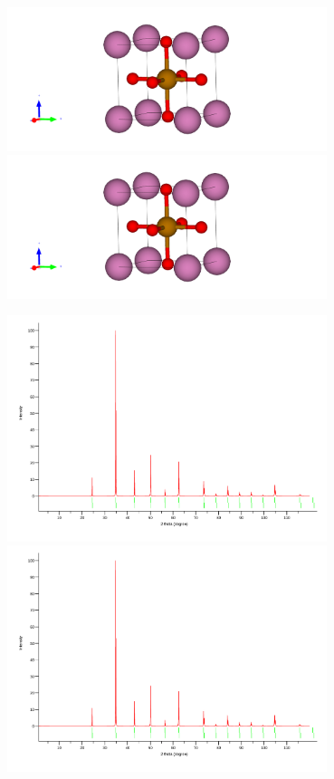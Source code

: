 \documentclass[12pt, letterpaper]{article}
\newcommand*{\1}{\hspace{1pt}}
\begin{document}
    \begin{adjustbox}{center,caption={Cubic Structure of InCoO3 and InFeO3},label={somelabel},nofloat=figure,vspace=\bigskipamount}
        \includegraphics[width=0.7\textwidth]{InFeO3}
        \includegraphics[width=0.7\textwidth]{InFeO3}
    \end{adjustbox}

    \begin{adjustbox}{center,caption={X-Ray diffraction pattern of InCoO3 and InFeO3},label={somelabel},nofloat=figure,vspace=\bigskipamount}
        \includegraphics[width=0.7\textwidth]{POSCARCo}
        \includegraphics[width=0.7\textwidth]{POSCARFe}
    \end{adjustbox}
    
\end{document}
